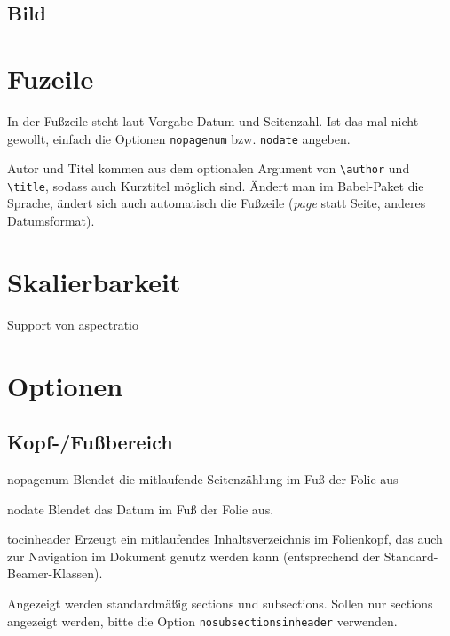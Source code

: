 \documentclass[a4paper,colorscheme=green,TUBStitlepage=picture]{tubsreprt}
\begin{document}
\subsection{Bild}



\section{Fuzeile}

In der Fußzeile steht laut Vorgabe Datum und Seitenzahl.
Ist das mal nicht gewollt, einfach die Optionen \lstinline{nopagenum} bzw.
\lstinline{nodate} angeben.

Autor und Titel kommen aus dem optionalen Argument von \lstinline{\author}
und \lstinline{\title}, sodass auch Kurztitel möglich sind.
Ändert man im Babel-Paket die Sprache, ändert sich auch automatisch
die Fußzeile (\textit{page} statt Seite, anderes Datumsformat).


\section{Skalierbarkeit}

Support von aspectratio


\section{Optionen}


\subsection{Kopf-/Fußbereich}

\begin{classoption}{nopagenum}
  Blendet die mitlaufende Seitenzählung im Fuß der Folie aus
\end{classoption}

\begin{classoption}{nodate}
  Blendet das Datum im Fuß der Folie aus.
\end{classoption}

\begin{classoption}{tocinheader}
  Erzeugt ein mitlaufendes Inhaltsverzeichnis im Folienkopf,
  das auch zur Navigation im Dokument genutz werden kann
  (entsprechend der Standard-Beamer-Klassen).
  
  Angezeigt werden standardmäßig sections und subsections.
  Sollen nur sections angezeigt werden, bitte die Option
  \lstinline{nosubsectionsinheader} verwenden.
  
\end{classoption}
\end{document}

